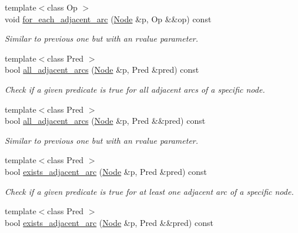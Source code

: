 \begin{DoxyCompactItemize}
{\footnotesize template$<$class Op $>$ }\\void \hyperlink{class_designar_1_1_base_graph_a21553c1d96334e4cf2e0e2086e0efeba}{for\+\_\+each\+\_\+adjacent\+\_\+arc} (\hyperlink{namespace_designar_a5af326c65aa2bd26b26c410f2030d09e}{Node} \&p, Op \&\&op) const
\begin{DoxyCompactList}\small\item\em Similar to previous one but with an rvalue parameter. \end{DoxyCompactList}\item 
{\footnotesize template$<$class Pred $>$ }\\bool \hyperlink{class_designar_1_1_base_graph_af7a57a1088105a79466546620bf830b3}{all\+\_\+adjacent\+\_\+arcs} (\hyperlink{namespace_designar_a5af326c65aa2bd26b26c410f2030d09e}{Node} \&p, Pred \&pred) const
\begin{DoxyCompactList}\small\item\em Check if a given predicate is true for all adjacent arcs of a specific node. \end{DoxyCompactList}\item 
{\footnotesize template$<$class Pred $>$ }\\bool \hyperlink{class_designar_1_1_base_graph_aaae4400215b8ea6b55941875981c3892}{all\+\_\+adjacent\+\_\+arcs} (\hyperlink{namespace_designar_a5af326c65aa2bd26b26c410f2030d09e}{Node} \&p, Pred \&\&pred) const
\begin{DoxyCompactList}\small\item\em Similar to previous one but with an rvalue parameter. \end{DoxyCompactList}\item 
{\footnotesize template$<$class Pred $>$ }\\bool \hyperlink{class_designar_1_1_base_graph_a5208fcd131d919271e1d54f6e45ab3e9}{exists\+\_\+adjacent\+\_\+arc} (\hyperlink{namespace_designar_a5af326c65aa2bd26b26c410f2030d09e}{Node} \&p, Pred \&pred) const
\begin{DoxyCompactList}\small\item\em Check if a given predicate is true for at least one adjacent arc of a specific node. \end{DoxyCompactList}\item 
{\footnotesize template$<$class Pred $>$ }\\bool \hyperlink{class_designar_1_1_base_graph_a16d3fbb089265c1dc8da8ffbe2fb1434}{exists\+\_\+adjacent\+\_\+arc} (\hyperlink{namespace_designar_a5af326c65aa2bd26b26c410f2030d09e}{Node} \&p, Pred \&\&pred) const

\end{DoxyCompactItemize}
